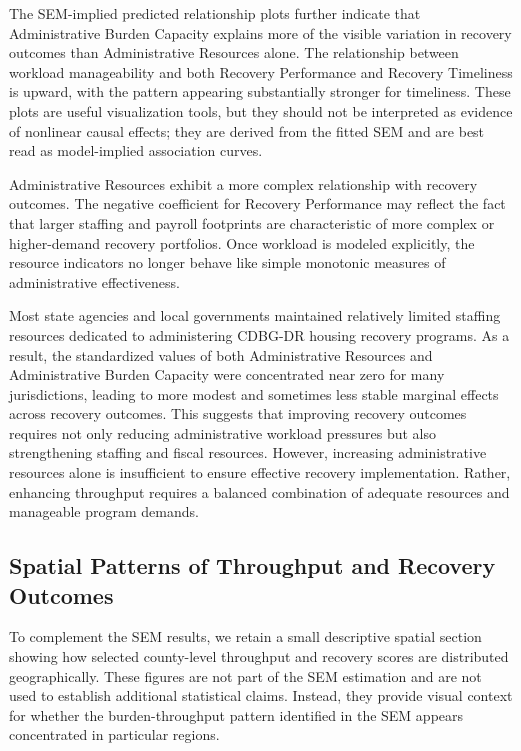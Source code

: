 \documentclass[
  number]{elsarticle}
\begin{document}
The SEM-implied predicted relationship plots further indicate that
Administrative Burden Capacity explains more of the visible variation in
recovery outcomes than Administrative Resources alone. The relationship
between workload manageability and both Recovery Performance and
Recovery Timeliness is upward, with the pattern appearing substantially
stronger for timeliness. These plots are useful visualization tools, but
they should not be interpreted as evidence of nonlinear causal effects;
they are derived from the fitted SEM and are best read as model-implied
association curves.

Administrative Resources exhibit a more complex relationship with
recovery outcomes. The negative coefficient for Recovery Performance may
reflect the fact that larger staffing and payroll footprints are
characteristic of more complex or higher-demand recovery portfolios.
Once workload is modeled explicitly, the resource indicators no longer
behave like simple monotonic measures of administrative effectiveness.

Most state agencies and local governments maintained relatively limited
staffing resources dedicated to administering CDBG-DR housing recovery
programs. As a result, the standardized values of both Administrative
Resources and Administrative Burden Capacity were concentrated near zero
for many jurisdictions, leading to more modest and sometimes less stable
marginal effects across recovery outcomes. This suggests that improving
recovery outcomes requires not only reducing administrative workload
pressures but also strengthening staffing and fiscal resources. However,
increasing administrative resources alone is insufficient to ensure
effective recovery implementation. Rather, enhancing throughput requires
a balanced combination of adequate resources and manageable program
demands.

\subsection{Spatial Patterns of Throughput and Recovery
Outcomes}\label{spatial-patterns-of-throughput-and-recovery-outcomes}

To complement the SEM results, we retain a small descriptive spatial
section showing how selected county-level throughput and recovery scores
are distributed geographically. These figures are not part of the SEM
estimation and are not used to establish additional statistical claims.
Instead, they provide visual context for whether the burden-throughput
pattern identified in the SEM appears concentrated in particular
regions.
\end{document}
